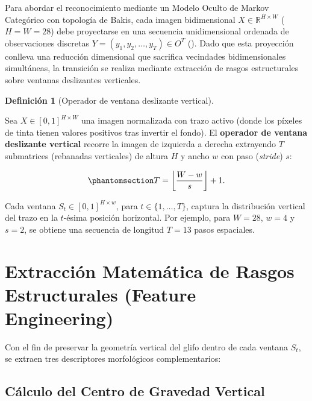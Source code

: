 \documentclass[
  spanish,
  us-letterpaper,
]{scrreprt}
\theoremstyle{definition}
\newtheorem{definition}{Definición}[chapter]
\theoremstyle{remark}
\begin{document}
Para abordar el reconocimiento mediante un Modelo Oculto de Markov
Categórico con topología de Bakis, cada imagen bidimensional
\(X \in \mathbb{R}^{H \times W}\) (\(H = W = 28\)) debe proyectarse en
una secuencia unidimensional ordenada de observaciones discretas
\(Y = (y_1, y_2, \dots, y_T) \in O^T\) (). Dado que esta proyección conlleva una reducción dimensional
que sacrifica vecindades bidimensionales simultáneas, la transición se
realiza mediante extracción de rasgos estructurales sobre ventanas
deslizantes verticales.

\begin{definition}[Operador de ventana deslizante
vertical]\protect\hypertarget{def-ventana-deslizante}{}\label{def-ventana-deslizante}

Sea \(X \in [0, 1]^{H \times W}\) una imagen normalizada con trazo
activo (donde los píxeles de tinta tienen valores positivos tras
invertir el fondo). El \textbf{operador de ventana deslizante vertical}
recorre la imagen de izquierda a derecha extrayendo \(T\) submatrices
(rebanadas verticales) de altura \(H\) y ancho \(w\) con paso
(\emph{stride}) \(s\):

\begin{equation}\phantomsection\label{eq-longitud-secuencia}{
T = \left\lfloor \frac{W - w}{s} \right\rfloor + 1.
}\end{equation}

Cada ventana \(S_t \in [0, 1]^{H \times w}\), para
\(t \in \{1, \dots, T\}\), captura la distribución vertical del trazo en
la \(t\)-ésima posición horizontal. Por ejemplo, para \(W = 28\),
\(w = 4\) y \(s = 2\), se obtiene una secuencia de longitud \(T = 13\)
pasos espaciales.

\end{definition}

\section{Extracción Matemática de Rasgos Estructurales (Feature
Engineering)}\label{extracciuxf3n-matemuxe1tica-de-rasgos-estructurales-feature-engineering}

Con el fin de preservar la geometría vertical del glifo dentro de cada
ventana \(S_t\), se extraen tres descriptores morfológicos
complementarios:

\subsection{Cálculo del Centro de Gravedad
Vertical}\label{cuxe1lculo-del-centro-de-gravedad-vertical}
\end{document}
